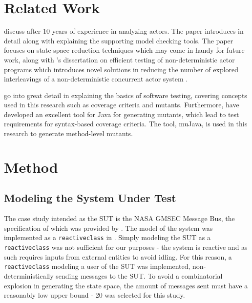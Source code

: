 \documentclass{article}
\begin{document}
	\section{Related Work}
	\citet{DBLP:conf/birthday/SirjaniJ11} discuss \Rebeca after 10 years of experience in analyzing actors. The paper introduces \Rebeca in detail along with explaining the supporting model checking tools. The paper focuses on state-space reduction techniques which may come in handy for future work, along with \citeauthor{tasharofi2014efficient}'s dissertation on efficient testing of non-deterministic actor programs which introduces novel solutions in reducing the number of explored interleavings of a non-deterministic concurrent actor system \citep{tasharofi2014efficient}.

		\citet{ammann2008introduction} go into great detail in explaining the basics of software testing, covering concepts used in this research such as coverage criteria and mutants. Furthermore, \citet{mujava} have developed an excellent tool for Java for generating mutants, which lead to test requirements for syntax-based coverage criteria. The tool, muJava, is used in this research to generate method-level mutants.

		
	\section{Method}
		\subsection{Modeling the System Under Test}
			The case study intended as the SUT is the NASA GMSEC Message Bus, the specification of which was provided by \citeauthor{fraunhofer}. The model of the system was implemented as a \texttt{reactiveclass} in \Rebeca. Simply modeling the SUT as a \texttt{reactiveclass} was not sufficient for our purposes \-- the system is reactive and as such requires inputs from external entities to avoid idling. For this reason, a \texttt{reactiveclass} modeling a user of the SUT was implemented, non-deterministically sending messages to the SUT. To avoid a combinatorial explosion in generating the state space, the amount of messages sent must have a reasonably low upper bound \-- 20 was selected for this study.
\end{document}
